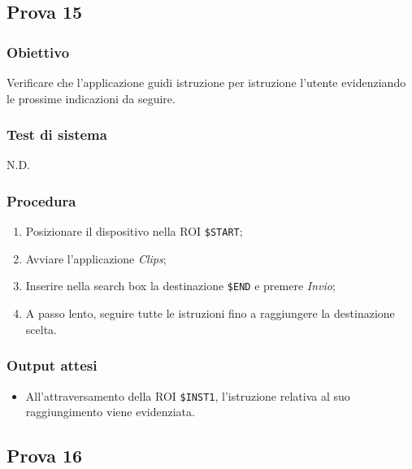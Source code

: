 \documentclass[../Sperimentazione.tex]{subfiles}
\begin{document}

\newpage	
\subsection{Prova 15} %
\label{subsec:Prova15}
	
	\subsubsection{Obiettivo}
		Verificare che l'applicazione guidi istruzione per istruzione l'utente evidenziando le prossime indicazioni da seguire.
		
	\subsubsection{Test di sistema}
		N.D.
		
	\subsubsection{Procedura}
		\begin{enumerate}
		\item Posizionare il dispositivo nella ROI  \verb|$START|;
		\item Avviare l'applicazione \textit{Clips};
		\item Inserire nella search box la destinazione  \verb|$END| e premere \textit{Invio};
		\item A passo lento, seguire tutte le istruzioni fino a raggiungere la destinazione scelta.
		\end{enumerate}
		
	\subsubsection{Output attesi}
		\begin{itemize}
		\item All'attraversamento della ROI  \verb|$INST1|, l'istruzione relativa al suo raggiungimento viene evidenziata.
		\end{itemize}
	
	
		
		
\newpage	
\subsection{Prova 16} %
\label{subsec:Prova16}	
	
\end{document}
